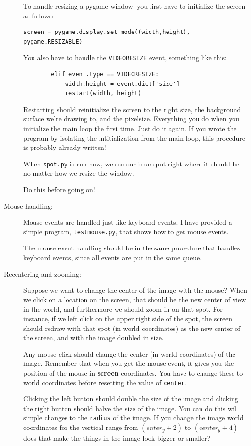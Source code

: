 \documentclass[12pt]{article}
\begin{document}
\begin{description}
To handle resizing a pygame window, you first
have to initialize the screen as follows:
\begin{lstlisting}
screen = pygame.display.set_mode((width,height), pygame.RESIZABLE)
\end{lstlisting}
You also have to handle
the \lstinline{VIDEORESIZE} event, something like this:
\begin{lstlisting}
        elif event.type == VIDEORESIZE:
            width,height = event.dict['size']
            restart(width, height)
\end{lstlisting}
Restarting should reinitialize the screen to the right size,
the background surface we're drawing to, and the pixelsize.
Everything you do when you initialize 
the main loop the first time.  Just do it again.
If you wrote the program by isolating the intitialization
from the main loop, this procedure is probably already
written!

When {\tt spot.py} is run now,
we see our blue spot right where it should be
no matter how we resize the window.

Do this before going on!

\item[Mouse handling:]  Mouse events are handled just
like keyboard events.  I have provided a simple
program, \lstinline{testmouse.py}, that shows how to
get mouse events.

The mouse event handling should be in the same procedure
that handles keyboard events, since all events are put
in the same queue.

\item[Recentering and zooming:]
Suppose we want to change the center of the image
with the mouse?  When we click on a location on the screen,
that should be the new center of view in the world, and furthermore
we should
zoom in on that spot.
For instance, if we left click on the upper right side of the
spot, the screen should redraw with that spot 
(in world coordinates)
as the new center of the screen, and with the image doubled
in size. 

Any mouse click should change the center (in world coordinates)
of the image.  Remember that when you get the mouse event,
it gives you the position of the mouse in {\bf screen} 
coordinates.  You have to change these to world
coordinates before resetting the value of \lstinline{center}.

Clicking the left button should double the size of the
image and clicking the right button should halve the size
of the image.  You can do this wil simple changes to the
\lstinline{radius} of the image.  If you change the
image world coordinates for the vertical range
from $(enter_y \pm 2)$ to $(center_y \pm 4)$ does that make the
things in the image look bigger or smaller?


\end{description}
\end{document}
